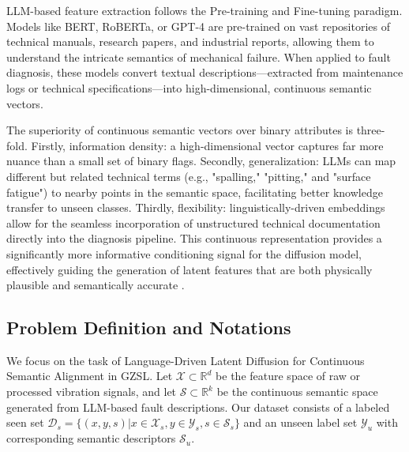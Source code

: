 LLM-based feature extraction follows the Pre-training and Fine-tuning paradigm. Models like BERT, RoBERTa, or GPT-4 are pre-trained on vast repositories of technical manuals, research papers, and industrial reports, allowing them to understand the intricate semantics of mechanical failure. When applied to fault diagnosis, these models convert textual descriptions—extracted from maintenance logs or technical specifications—into high-dimensional, continuous semantic vectors.

The superiority of continuous semantic vectors over binary attributes is three-fold. Firstly, information density: a high-dimensional vector captures far more nuance than a small set of binary flags. Secondly, generalization: LLMs can map different but related technical terms (e.g., "spalling," "pitting," and "surface fatigue") to nearby points in the semantic space, facilitating better knowledge transfer to unseen classes. Thirdly, flexibility: linguistically-driven embeddings allow for the seamless incorporation of unstructured technical documentation directly into the diagnosis pipeline. This continuous representation provides a significantly more informative conditioning signal for the diffusion model, effectively guiding the generation of latent features that are both physically plausible and semantically accurate \cite{brown2020language}.

\subsection{Problem Definition and Notations}
\label{subsec:problem_definition}

We focus on the task of Language-Driven Latent Diffusion for Continuous Semantic Alignment in GZSL. Let $\mathcal{X} \subset \mathbb{R}^d$ be the feature space of raw or processed vibration signals, and let $\mathcal{S} \subset \mathbb{R}^k$ be the continuous semantic space generated from LLM-based fault descriptions. Our dataset consists of a labeled seen set $\mathcal{D}_s = \{(x, y, s) | x \in \mathcal{X}_s, y \in \mathcal{Y}_s, s \in \mathcal{S}_s\}$ and an unseen label set $\mathcal{Y}_u$ with corresponding semantic descriptors $\mathcal{S}_u$.


